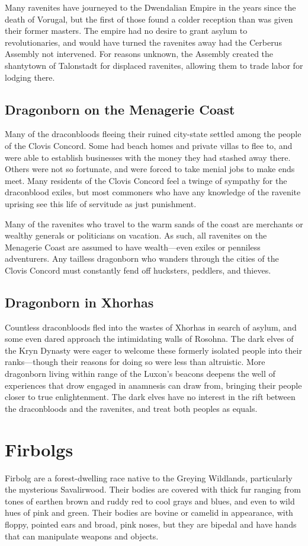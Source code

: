 \documentclass[10pt,a4paper,twoside,bg=print,twocolumn,openany,nodeprecatedcode]{dndbook}
\begin{document}
Many ravenites have journeyed to the Dwendalian Empire in the years since the death of Vorugal, but the first of those found a colder reception than was given their former masters. The empire had no desire to grant asylum to revolutionaries, and would have turned the ravenites away had the Cerberus Assembly not intervened. For reasons unknown, the Assembly created the shantytown of Talonstadt for displaced ravenites, allowing them to trade labor for lodging there.

\subsection{Dragonborn on the Menagerie Coast}
Many of the draconbloods fleeing their ruined city-state settled among the people of the Clovis Concord. Some had beach homes and private villas to flee to, and were able to establish businesses with the money they had stashed away there. Others were not so fortunate, and were forced to take menial jobs to make ends meet. Many residents of the Clovis Concord feel a twinge of sympathy for the draconblood exiles, but most commoners who have any knowledge of the ravenite uprising see this life of servitude as just punishment.

Many of the ravenites who travel to the warm sands of the coast are merchants or wealthy generals or politicians on vacation. As such, all ravenites on the Menagerie Coast are assumed to have wealth—even exiles or penniless adventurers. Any tailless dragonborn who wanders through the cities of the Clovis Concord must constantly fend off hucksters, peddlers, and thieves.

\subsection{Dragonborn in Xhorhas}
Countless draconbloods fled into the wastes of Xhorhas in search of asylum, and some even dared approach the intimidating walls of Rosohna. The dark elves of the Kryn Dynasty were eager to welcome these formerly isolated people into their ranks—though their reasons for doing so were less than altruistic. More dragonborn living within range of the Luxon's beacons deepens the well of experiences that drow engaged in anamnesis can draw from, bringing their people closer to true enlightenment. The dark elves have no interest in the rift between the draconbloods and the ravenites, and treat both peoples as equals.

\section{Firbolgs}
Firbolg are a forest-dwelling race native to the Greying Wildlands, particularly the mysterious Savalirwood. Their bodies are covered with thick fur ranging from tones of earthen brown and ruddy red to cool grays and blues, and even to wild hues of pink and green. Their bodies are bovine or camelid in appearance, with floppy, pointed ears and broad, pink noses, but they are bipedal and have hands that can manipulate weapons and objects.
\end{document}
